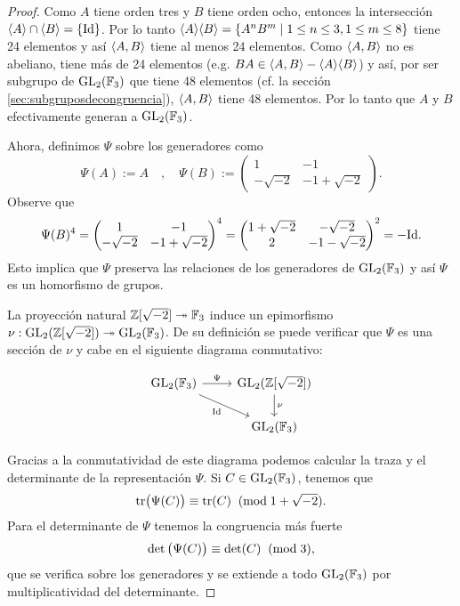 \begin{proof}
  Como $A$ tiene orden tres y $B$ tiene orden ocho, entonces la intersecci\'on $\langle A \rangle\cap\langle B \rangle=\{\mathrm{Id}\}$. Por lo tanto $\langle A \rangle\langle B \rangle=\{A^nB^m\mid 1\leq n\leq 3,1\leq m\leq 8\}$ tiene 24 elementos y as\'i $\langle A,B \rangle$ tiene al menos 24 elementos. Como $\langle A,B \rangle$ no es abeliano, tiene m\'as de 24 elementos (e.g. $BA\in\langle A,B \rangle-\langle A \rangle\langle B \rangle$) y as\'i, por ser subgrupo de $\mathrm{GL}_2(\mathbb{F}_3)$ que tiene 48 elementos (cf. la sección \ref{sec:subgruposdecongruencia}), $\langle A,B \rangle$ tiene 48 elementos. Por lo tanto que $A$ y $B$ efectivamente generan a $\mathrm{GL}_2(\mathbb{F}_3)$.
  
Ahora, definimos $\Psi$ sobre los generadores como
  \[
    \Psi(A):= A \quad,\quad
    \Psi(B):=
    \begin{pmatrix}1 & -1 \\ -\sqrt{-2} & -1+\sqrt{-2}\end{pmatrix}.
  \]
Observe que 
\[
	\Psi(B)^4=\begin{pmatrix}1 & -1\\ -\sqrt{-2} & -1+\sqrt{-2}\end{pmatrix}^4=\begin{pmatrix}1+\sqrt{-2} & -\sqrt{-2}\\ 2 & -1-\sqrt{-2}\end{pmatrix}^2=-\mathrm{Id}.
\]
Esto implica que $\Psi$ preserva las relaciones de los generadores de $\mathrm{GL}_2(\mathbb{F}_3)$ y as\'i $\Psi$ es un homorfismo de grupos.

  La proyecci\'on natural $\mathbb{Z}[\sqrt{-2}]\twoheadrightarrow\mathbb{F}_3$ induce un epimorfismo $\nu:\mathrm{GL}_2(\mathbb{Z}[\sqrt{-2}])\twoheadrightarrow\mathrm{GL}_2(\mathbb{F}_3)$. De su definici\'on se puede verificar que $\Psi$ es una secci\'on de $\nu$ y cabe en el siguiente diagrama conmutativo:
  
\begin{equation}\label{cd:seccion_de_nu}
  \begin{tikzcd}
    \GL_2(\FF_3) \arrow[r,"\Psi"] \arrow[dr,"\Id"'] & \GL_2(\ZZ[\sqrt{-2}]) \arrow[d,"\nu"] \\
    & \GL_2(\FF_3)
  \end{tikzcd}
\end{equation}
  
  Gracias a la conmutatividad de este diagrama podemos calcular la traza y el determinante de la representaci\'on $\Psi$. Si $C\in\mathrm{GL}_2(\mathbb{F}_3)$, tenemos que
  \begin{equation}
    \label{eq:traza_mod_3}
    \mathrm{tr}\big(\Psi(C)\big)\equiv\mathrm{tr}(C) \;\;(\mathrm{mod}\; 1+\sqrt{-2}).
  \end{equation}
  Para el determinante de $\Psi$ tenemos la congruencia m\'as fuerte
    \begin{equation}
    \label{eq:det_mod_3}
    \det\big(\Psi(C)\big)\equiv\det(C) \;\;(\mathrm{mod}\; 3),
  \end{equation}
  que se verifica sobre los generadores y se extiende a todo $\mathrm{GL}_2(\mathbb{F}_3)$ por multiplicatividad del determinante.
  

\end{proof}
